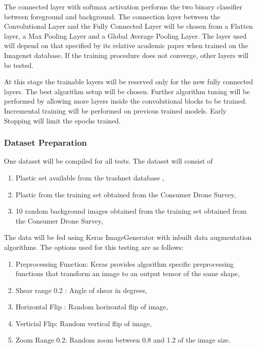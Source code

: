 \documentclass{IEEEtran}
\begin{document}
The connected layer with softmax activation performs the two binary classifier between foreground and background. The connection layer between the Convolutional Layer and the Fully Connected Layer will be chosen from a Flatten layer, a Max Pooling Layer and a Global Average Pooling Layer. The layer used will depend on that specified by its relative academic paper when trained on the Imagenet database. If the training procedure does not converge, other layers will be tested.\newline

At this stage the trainable layers will be reserved only for the new fully connected layers. The best algorithm setup will be chosen. Further algorithm tuning will be performed by allowing more layers inside the convolutional blocks to be trained. Incremental training will be performed on previous trained models. Early Stopping will limit the epochs trained. \newline

\subsubsection{Dataset Preparation}

One dataset will be compiled for all tests. The dataset will consist of 
\begin{enumerate}
\item Plastic set available from the trashnet database \cite{Thung2017},
\item Plastic from the training set obtained from the Consumer Drone Survey,
\item 10 random background images obtained from the training set obtained from the Consumer Drone Survey,
\end{enumerate}
\par
The data will be fed using Keras ImageGenerator with inbuilt data augmentation algorithms. The options used for this testing are as follows:
\begin{enumerate}
\item Preprocessing Function: Keras provides algorithm specific preprocessing functions that transform an image to an output tensor of the same shape,
\item Shear range 0.2 : Angle of shear in degrees,
\item Horizontal Flip : Random horizontal flip of image,
\item Verticial Flip: Random vertical flip of image,
\item Zoom Range 0.2: Random zoom between 0.8 and 1.2 of the image size.
\end{enumerate}
\end{document}

